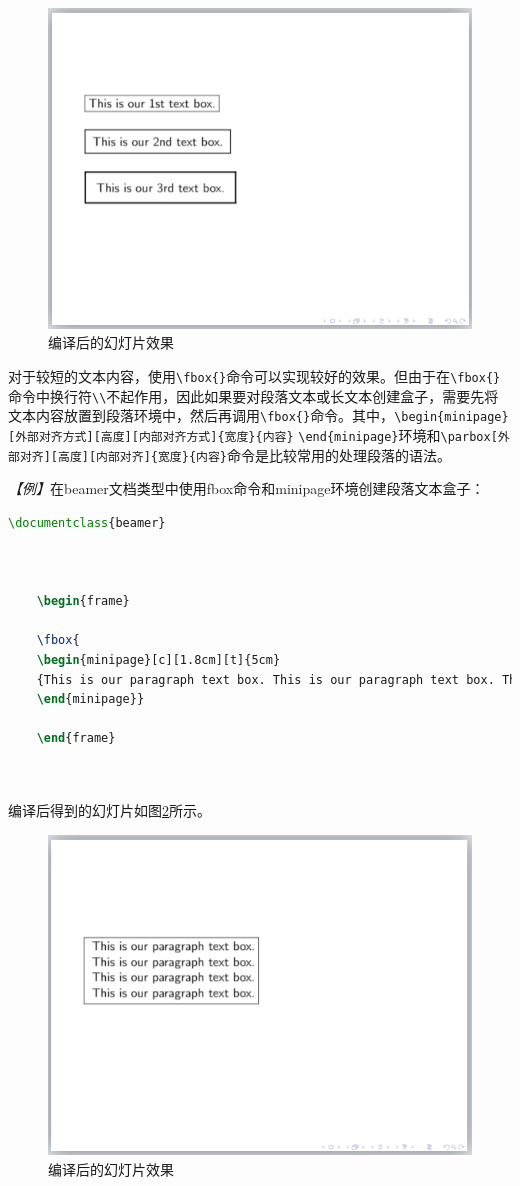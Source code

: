 \begin{figure}[htbp]
    \centering
    \includegraphics[width = 0.6\linewidth]{images/ch_9/NEWexample06new.png}
    \caption{编译后的幻灯片效果}
    \label{fig:919}
\end{figure}

对于较短的文本内容，使用\texttt{\textbackslash{}fbox\{\}}命令可以实现较好的效果。但由于在\texttt{\textbackslash{}fbox\{\}}命令中换行符\texttt{\textbackslash{}\textbackslash{}}不起作用，因此如果要对段落文本或长文本创建盒子，需要先将文本内容放置到段落环境中，然后再调用\texttt{\textbackslash{}fbox\{\}}命令。其中，\texttt{\textbackslash{}begin\{minipage\}[外部对齐方式][高度][内部对齐方式]\{宽度\}\{内容\}} \texttt{\textbackslash{}end\{minipage\}}环境和\texttt{\textbackslash{}parbox[外部对齐][高度][内部对齐]\{宽度\}\{内容\}}命令是比较常用的处理段落的语法。

\emph{【例】}在beamer文档类型中使用fbox命令和minipage环境创建段落文本盒子：
\begin{lstlisting}[language=TeX]
    \documentclass{beamer}

    

    \begin{frame}

    \fbox{
    \begin{minipage}[c][1.8cm][t]{5cm}
    {This is our paragraph text box. This is our paragraph text box. This is our paragraph text box. This is our paragraph text box.}
    \end{minipage}}

    \end{frame}

    
\end{lstlisting}

编译后得到的幻灯片如图\ref{fig:920}所示。

\begin{figure}[htbp]
    \centering
    \includegraphics[width = 0.6\linewidth]{images/ch_9/NEWexample07.png}
    \caption{编译后的幻灯片效果}
    \label{fig:920}
\end{figure}

